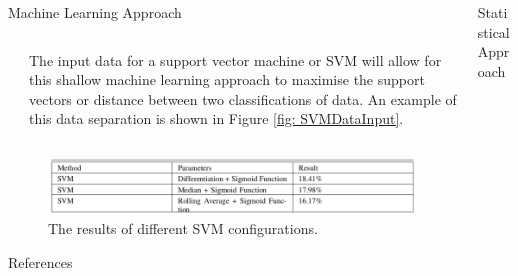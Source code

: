 \documentclass[final]{beamer}
\begin{document}
\begin{frame}{}
\begin{columns}[t]
\begin{column}{.48\linewidth}
\begin{block}{Machine Learning Approach}
\begin{columns}[t]
\begin{column}{0.48\linewidth}
         \end{column}
         
         \begin{column}{0.42\linewidth}
         
         The input data for a support vector machine or SVM will allow for this shallow machine learning approach to maximise the support vectors or distance between two classifications of data. An example of this data separation is shown in Figure \ref{fig: SVMDataInput}. 
         
         \end{column}   
         
         \end{columns}
		
		\begin{figure}
         \includegraphics[width=0.8\columnwidth]{table3}
         \caption{The results of different SVM configurations.}
         \label{table: SVM Results}
         \end{figure}
		
		\end{block}


		\begin{block}{References}
		
		
		
		

		\nocite{*}
		
		\end{block}
        

      \end{column}


      \begin{column}{.48\linewidth}
        
        
         \begin{block}{Statistical Approach}
         
         \begin{columns}[t]
         

\end{columns}
\end{block}
\end{column}
\end{columns}
\end{frame}
\end{document}
